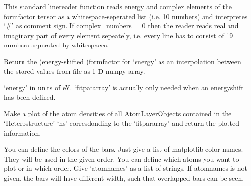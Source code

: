 \documentclass[letterpaper,10pt,english]{sphinxmanual}
\begin{document}
\begin{fulllineitems}
\begin{fulllineitems}
This standard linereader function reads energy and complex elements of the formfactor tensor as a whitespace-seperated list (i.e. 10 numbers) and interpretes ‘\#’ as comment sign.
If complex\_numbers==0 then the reader reads real and imaginary part of every element sepeately, i.e. every line has to consist of 19 numbers seperated by whitespaces.

\end{fulllineitems}


\begin{fulllineitems}
\label{\detokenize{modules-api/samplerepresentation:SampleRepresentation.FFfromFile.getFF}}
Return the (energy-shifted )formfactor for ‘energy’ as an interpolation between the stored values from file as 1-D numpy array.

‘energy’ in units of eV.
‘fitpararray’ is actually only needed when an energyshift has been defined.

\end{fulllineitems}


\end{fulllineitems}


\begin{fulllineitems}
\label{\detokenize{modules-api/samplerepresentation:SampleRepresentation.plotAtomDensity}}
Make a plot of the atom densities of all AtomLayerObjects contained in the ‘Heterostructure’ ‘hs’ corresdonding to the ‘fitpararray’ and return the plotted information.

You can  define the colors of the bars. Just give a list of matplotlib color names. They will be used in the given order.
You can define which atoms you want to plot or in which order. Give ‘atomnames’ as a list of strings. If atomnames is not given, the bars will have different width, such that overlapped bars can be seen.

\end{fulllineitems}

\end{document}
